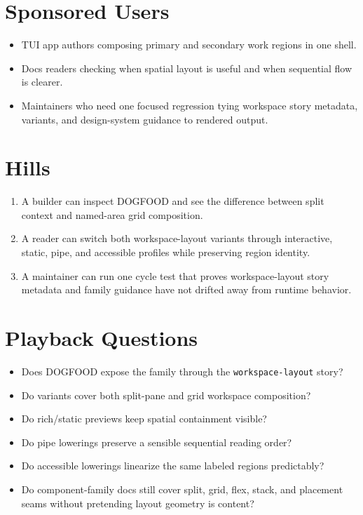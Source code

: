 \section{Sponsored Users}\label{record-106-sponsored-users}

\begin{itemize}
\tightlist
\item
  TUI app authors composing primary and secondary work regions in one shell.
\item
  Docs readers checking when spatial layout is useful and when sequential flow is clearer.
\item
  Maintainers who need one focused regression tying workspace story metadata, variants, and design-system guidance to rendered output.
\end{itemize}

\section{Hills}\label{record-106-hills}

\begin{enumerate}
\def\labelenumi{\arabic{enumi}.}
\tightlist
\item
  A builder can inspect DOGFOOD and see the difference between split context and named-area grid composition.
\item
  A reader can switch both workspace-layout variants through interactive, static, pipe, and accessible profiles while preserving region identity.
\item
  A maintainer can run one cycle test that proves workspace-layout story metadata and family guidance have not drifted away from runtime behavior.
\end{enumerate}

\section{Playback Questions}\label{record-106-playback-questions}

\begin{itemize}
\tightlist
\item
  Does DOGFOOD expose the family through the \texttt{w\allowbreak{}o\allowbreak{}r\allowbreak{}k\allowbreak{}s\allowbreak{}p\allowbreak{}a\allowbreak{}c\allowbreak{}e\allowbreak{}-\allowbreak{}l\allowbreak{}a\allowbreak{}y\allowbreak{}o\allowbreak{}u\allowbreak{}t} story?
\item
  Do variants cover both split-pane and grid workspace composition?
\item
  Do rich/static previews keep spatial containment visible?
\item
  Do pipe lowerings preserve a sensible sequential reading order?
\item
  Do accessible lowerings linearize the same labeled regions predictably?
\item
  Do component-family docs still cover split, grid, flex, stack, and placement seams without pretending layout geometry is content?
\end{itemize}

